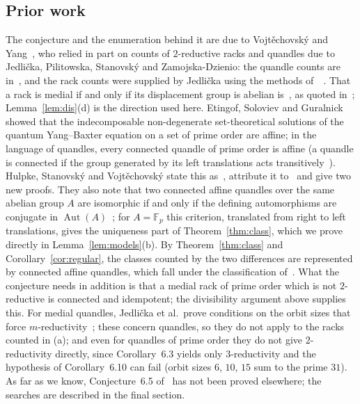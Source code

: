 \documentclass[11pt]{article}
\theoremstyle{definition}
\theoremstyle{remark}
\newcommand{\F}{\mathbb F}
\DeclareMathOperator{\Aut}{Aut}
\begin{document}
\subsection*{Prior work}
The conjecture and the enumeration behind it are due to Vojt\v{e}chovsk\'y and
Yang~\cite{vy}, who relied in part on counts of $2$-reductive racks and
quandles due to Jedli\v{c}ka, Pilitowska, Stanovsk\'y and Zamojska-Dzienio:
the quandle counts are in~\cite{jpsz}, and the rack counts were supplied by
Jedli\v{c}ka using the methods of~\cite{jpsz}~\cite[p.~5]{vy}. That a rack is medial if and only if its
displacement group is abelian is~\cite[Proposition~2.4(ii)]{hsv}, as quoted
in~\cite[Section~1.1]{vy}; Lemma~\ref{lem:dis}(d) is the direction used here.
Etingof, Soloviev and Guralnick~\cite{esg} showed that the indecomposable
non-degenerate set-theoretical solutions of the quantum Yang--Baxter equation
on a set of prime order are affine; in the language of quandles, every
connected quandle of prime order is affine (a quandle is connected if the group
generated by its left translations acts transitively~\cite[p.~3]{vy}). Hulpke, Stanovsk\'y and
Vojt\v{e}chovsk\'y state this as~\cite[Theorem~9.3]{hsv}, attribute it
to~\cite{esg} and give two new proofs. They also note that two connected affine
quandles over the same abelian group $A$ are isomorphic if and only if the
defining automorphisms are conjugate in $\Aut(A)$~\cite[p.~14]{hsv}; for
$A=\F_p$ this criterion, translated from right to left translations, gives the
uniqueness part of Theorem~\ref{thm:class}, which we prove directly in
Lemma~\ref{lem:models}(b). By
Theorem~\ref{thm:class} and Corollary~\ref{cor:regular}, the classes counted by
the two differences are represented by connected affine quandles, which fall
under the classification of~\cite{esg,hsv}. What the conjecture needs in
addition is that a medial rack of prime order which is not $2$-reductive is
connected and idempotent; the divisibility argument above supplies this. For
medial quandles, Jedli\v{c}ka et al.\ prove conditions on the orbit sizes that
force $m$-reductivity~\cite[Corollaries~6.3 and~6.10]{jpsz}; these concern
quandles, so they do not apply to the racks counted in (a); and even for
quandles of prime order they do not give $2$-reductivity directly, since
Corollary~6.3 yields only $3$-reductivity and the hypothesis of
Corollary~6.10 can fail (orbit sizes $6$, $10$, $15$ sum to the prime $31$). As far as we know,
Conjecture~6.5 of~\cite{vy} has not been proved elsewhere; the searches are
described in the final section.
\end{document}
